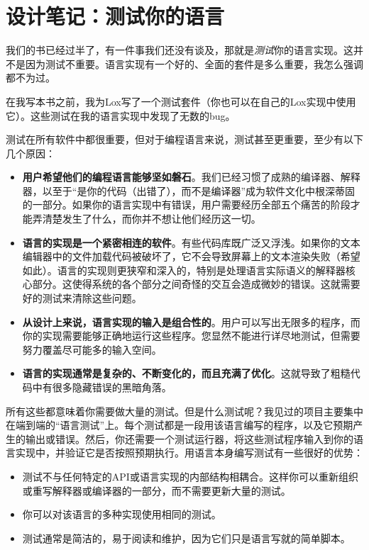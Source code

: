 \documentclass[cn,11pt,chinese]{elegantbook}
\begin{document}
\section{设计笔记：测试你的语言}

我们的书已经过半了，有一件事我们还没有谈及，那就是\textit{测试}你的语言实现。这并不是因为测试不重要。语言实现有一个好的、全面的套件是多么重要，我怎么强调都不为过。

在我写本书之前，我为Lox写了一个测试套件（你也可以在自己的Lox实现中使用它）。这些测试在我的语言实现中发现了无数的bug。

测试在所有软件中都很重要，但对于编程语言来说，测试甚至更重要，至少有以下几个原因：

\begin{itemize}
\item \textbf{用户希望他们的编程语言能够坚如磐石}。我们已经习惯了成熟的编译器、解释器，以至于“是你的代码（出错了），而不是编译器”成为软件文化中根深蒂固的一部分。如果你的语言实现中有错误，用户需要经历全部五个痛苦的阶段才能弄清楚发生了什么，而你并不想让他们经历这一切。
\item \textbf{语言的实现是一个紧密相连的软件}。有些代码库既广泛又浮浅。如果你的文本编辑器中的文件加载代码被破坏了，它不会导致屏幕上的文本渲染失败（希望如此）。语言的实现则更狭窄和深入的，特别是处理语言实际语义的解释器核心部分。这使得系统的各个部分之间奇怪的交互会造成微妙的错误。这就需要好的测试来清除这些问题。
\item \textbf{从设计上来说，语言实现的输入是组合性的}。用户可以写出无限多的程序，而你的实现需要能够正确地运行这些程序。您显然不能进行详尽地测试，但需要努力覆盖尽可能多的输入空间。
\item \textbf{语言的实现通常是复杂的、不断变化的，而且充满了优化}。这就导致了粗糙代码中有很多隐藏错误的黑暗角落。
\end{itemize}

所有这些都意味着你需要做大量的测试。但是什么测试呢？我见过的项目主要集中在端到端的“语言测试”上。每个测试都是一段用该语言编写的程序，以及它预期产生的输出或错误。然后，你还需要一个测试运行器，将这些测试程序输入到你的语言实现中，并验证它是否按照预期执行。用语言本身编写测试有一些很好的优势：

\begin{itemize}
  \item 测试不与任何特定的API或语言实现的内部结构相耦合。这样你可以重新组织或重写解释器或编译器的一部分，而不需要更新大量的测试。
  \item 你可以对该语言的多种实现使用相同的测试。
  \item 测试通常是简洁的，易于阅读和维护，因为它们只是语言写就的简单脚本。
\end{itemize}
\end{document}
